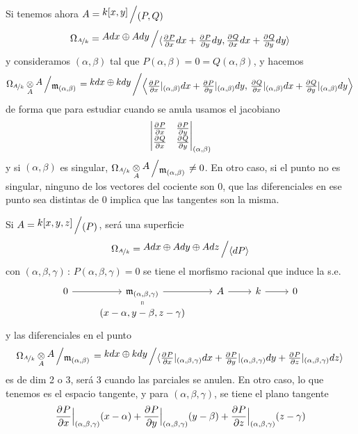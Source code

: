 \begin{ejem}
    Si tenemos ahora $A = \modulo{k[x,y]}{(P,Q)}$ 
    $$\Omega_{\nicefrac{A}{k}}= \modulo{Adx\oplus Ady}{\langle \pdd{P}{x} dx+\pdd{P}{y}dy, \pdd{Q}{x} dx+\pdd{Q}{y}dy \rangle}$$
    y consideramos $(\alpha, \beta)$ tal que $P(\alpha, \beta) = 0 = Q(\alpha, \beta)$, y hacemos
    $$\Omega_{\nicefrac{A}{k}} \underset{A}{\otimes} \modulo{A}{ \m_{(\alpha, \beta)} } = \modulo{kdx\oplus kdy}{ \left\langle  \pdd{P}{x}|_{(\alpha,\beta)} dx+\pdd{P}{y}|_{(\alpha,\beta)}dy, \, \pdd{Q}{x}|_{(\alpha,\beta)} dx+\pdd{Q}{y}|_{(\alpha,\beta)}dy   \right\rangle}$$
    de forma que para estudiar cuando se anula usamos el jacobiano
    $$ \left| \begin{matrix}
         \frac{\partial^{} P}{\partial x} & \frac{\partial^{} P}{\partial y} \\ \frac{\partial^{} Q}{\partial x} & \frac{\partial^{} Q}{\partial y} 
    \end{matrix} \right|_{(\alpha, \beta)}$$
    y si $(\alpha, \beta)$ es singular, $\Omega_{\nicefrac{A}{k}} \underset{A}{\otimes} \modulo{A}{ \m_{(\alpha, \beta)} } \neq 0$. En otro caso, si el punto no es singular, ninguno de los vectores del cociente son 0, que las diferenciales en ese punto sea distintas de 0 implica que las tangentes son la misma.
\end{ejem}
\begin{ejem}
    Si $A = \modulo{k[x,y,z]}{(P)}$, ser\'a una superficie
    $$\Omega_{\nicefrac{A}{k}} = \modulo{Adx\oplus Ady \oplus Adz}{\langle dP\rangle}$$ con $(\alpha,\beta, \gamma)\, : \, P(\alpha,\beta, \gamma)=0$ se tiene el morfismo racional que induce la s.e.
    $$\bt 0 \rar & \m_{(\alpha,\beta, \gamma)} \rar & A \rar & k \rar & 0\\[-5mm] & \arrow[equal]{u} (x-\alpha,y-\beta,z-\gamma) \et$$
    y las diferenciales en el punto
    $$\Omega_{\nicefrac{A}{k}} \underset{A}{\otimes} \modulo{A}{ \m_{(\alpha, \beta)} } = \modulo{kdx\oplus kdy}{ \langle  \pdd{P}{x}|_{(\alpha, \beta, \gamma)} dx+\pdd{P}{y}|_{(\alpha, \beta, \gamma)}dy +\pdd{P}{z}|_{(\alpha, \beta, \gamma)}dz    \rangle}$$
    es de dim 2 o 3, ser\'a 3 cuando las parciales se anulen. En otro caso, lo que tenemos es el espacio tangente, y para $(\alpha,\beta, \gamma)$, se tiene el plano tangente  
    $$\frac{\partial^{} P}{\partial x}\Big|_{(\alpha, \beta, \gamma)} (x-\alpha)+\frac{\partial^{} P}{\partial y}\Big|_{(\alpha, \beta, \gamma)} (y-\beta) +\frac{\partial^{} P}{\partial z}\Big|_{(\alpha, \beta, \gamma)} (z-\gamma)$$
\end{ejem}

